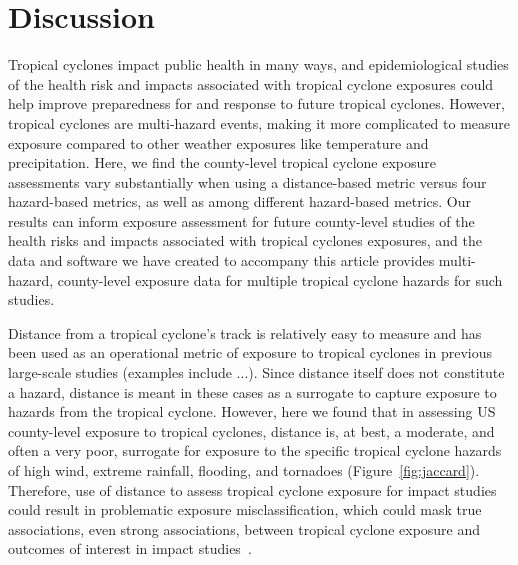 \section*{Discussion}

Tropical cyclones impact public health in many ways, and epidemiological
studies of the health risk and impacts associated with tropical cyclone
exposures could help improve preparedness for and response to future tropical
cyclones.  However, tropical cyclones are multi-hazard events, making it more
complicated to measure exposure compared to other weather exposures like
temperature and precipitation. Here, we find the county-level tropical cyclone
exposure assessments vary substantially when using a distance-based metric
versus four hazard-based metrics, as well as among different hazard-based
metrics. Our results can inform exposure assessment for future county-level
studies of the health risks and impacts associated with tropical cyclones
exposures, and the data and software we have created to accompany this article
provides multi-hazard, county-level exposure data for multiple tropical cyclone
hazards for such studies.

Distance from a tropical cyclone's track is relatively easy to measure and has
been used as an operational metric of exposure to tropical cyclones in previous
large-scale studies (examples include ...). Since distance itself
does not constitute a hazard, distance is meant in these cases as a surrogate
to capture exposure to hazards from the tropical cyclone. However, here we
found that in assessing \ac{US} county-level exposure to tropical cyclones,
distance is, at best, a moderate, and often a very poor, surrogate for exposure
to the specific tropical cyclone hazards of high wind, extreme rainfall,
flooding, and tornadoes (Figure~\ref{fig:jaccard}).  Therefore, use of distance
to assess tropical cyclone exposure for impact studies could result in
problematic exposure misclassification, which could mask true associations,
even strong associations, between tropical cyclone exposure and outcomes of
interest in impact studies~\parencite{savitz2016interpreting, armstrong1998effect}. 

